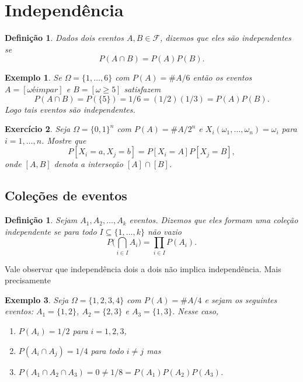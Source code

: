 \documentclass[reqno]{article}
\newcommand*\1{\mathds{1}}
\newtheorem{definition}[theorem]{Definição}
\newtheorem{example}{Exemplo}[section]
\newtheorem{exercise}[example]{Exercício}
\newcommand{\mcap}{\textstyle \bigcap\limits}
\begin{document}
\section{Independência}

\begin{definition}
  Dados dois eventos $A, B \in \mathcal{F}$, dizemos que eles são independentes se
  \begin{equation}
    P(A \cap B) = P(A) P(B).
  \end{equation}
\end{definition}

\begin{example}
  Se $\Omega = \{1, \dots, 6\}$ com $P(A) = \#A/6$ então os eventos $A = [\omega é impar]$ e $B = [\omega \geq 5]$ satisfazem
  \begin{equation}
    P(A \cap B) = P(\{5\}) = 1/6 = (1/2) (1/3) = P(A) P(B).
  \end{equation}
  Logo tais eventos são independentes.
\end{example}


\begin{exercise}
  Seja $\Omega = \{0,1\}^n$ com $P(A) = \#A/2^n$ e $X_i(\omega_1, \dots, \omega_n) = \omega_i$ para $i = 1, \dots, n$.
  Mostre que
  \begin{equation}
    P[X_i = a, X_j = b] = P[X_i = A] P[X_j = B],
  \end{equation}
  onde $[A,B]$ denota a interseção $[A] \cap [B]$.
\end{exercise}

\subsection{Coleções de eventos}

\begin{definition}
  Sejam $A_1, A_2, \dots, A_k$ eventos.
  Dizemos que eles formam uma coleção independente se para todo $I \subseteq \{1, \dots, k\}$ não vazio
  \begin{equation}
    P\Big( \mcap_{i \in I} A_i \Big) =  \prod\limits_{i \in I} P(A_i).
  \end{equation}
\end{definition}

Vale observar que independência dois a dois não implica independência.
Mais precisamente
\begin{example}
  Seja $\Omega = \{1,2,3,4\}$ com $P(A) = \# A/4$ e sejam os seguintes eventos: $A_1 = \{1,2\}$, $A_2 = \{2,3\}$ e $A_3 = \{1,3\}$.
  Nesse caso,
  \begin{enumerate}
  \item $P(A_i) = 1/2$ para $i = 1, 2, 3$,
  \item $P(A_i \cap A_j) = 1/4$ para todo $i \neq j$ mas
  \item $P(A_1 \cap A_2 \cap A_3) = 0 \neq 1/8 = P(A_1) P(A_2) P(A_3)$.
  \end{enumerate}
\end{example}
\end{document}
